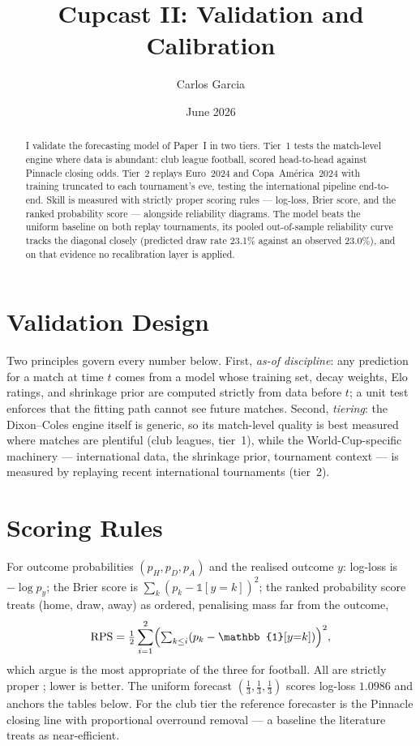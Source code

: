 \documentclass[11pt]{article}
\title{Cupcast II: Validation and Calibration}
\author{Carlos Garcia}
\date{June 2026}
\begin{document}
\maketitle

\begin{abstract}
I validate the forecasting model of Paper~I in two tiers. Tier~1 tests the
match-level engine where data is abundant: club league football, scored
head-to-head against Pinnacle closing odds. Tier~2 replays Euro~2024 and
Copa~Am\'erica~2024 with training truncated to each tournament's eve, testing
the international pipeline end-to-end. Skill is measured with strictly proper
scoring rules \cite{gneitingraftery2007} --- log-loss, Brier score, and the
ranked probability score \cite{constantinou2012} --- alongside reliability
diagrams. The model beats the uniform baseline on both replay tournaments, its
pooled out-of-sample reliability curve tracks the diagonal closely (predicted
draw rate 23.1\% against an observed 23.0\%), and on that evidence no
recalibration layer \cite{platt1999,zadroznyelkan2002} is applied.
\end{abstract}

\section{Validation Design}
Two principles govern every number below. First, \emph{as-of discipline}: any
prediction for a match at time $t$ comes from a model whose training set,
decay weights, Elo ratings, and shrinkage prior are computed strictly from
data before $t$; a unit test enforces that the fitting path cannot see future
matches. Second, \emph{tiering}: the Dixon--Coles engine itself is generic, so
its match-level quality is best measured where matches are plentiful (club
leagues, tier~1), while the World-Cup-specific machinery --- international
data, the shrinkage prior, tournament context --- is measured by replaying
recent international tournaments (tier~2).

\section{Scoring Rules}
For outcome probabilities $(p_H, p_D, p_A)$ and the realised outcome $y$:
log-loss is $-\log p_y$; the Brier score is
$\sum_k (p_k - \mathbb{1}[y{=}k])^2$; the ranked probability score treats
(home, draw, away) as ordered, penalising mass far from the outcome,
\begin{equation}
  \mathrm{RPS} = \tfrac{1}{2} \sum_{i=1}^{2}
  \Bigl(\textstyle\sum_{k \le i} (p_k - \mathbb{1}[y{=}k])\Bigr)^2,
\end{equation}
which \citet{constantinou2012} argue is the most appropriate of the three for
football. All are strictly proper \cite{gneitingraftery2007}; lower is better.
The uniform forecast $(\tfrac13,\tfrac13,\tfrac13)$ scores log-loss $1.0986$
and anchors the tables below. For the club tier the reference forecaster is the
Pinnacle closing line with proportional overround removal --- a baseline the
literature treats as near-efficient.
\end{document}

